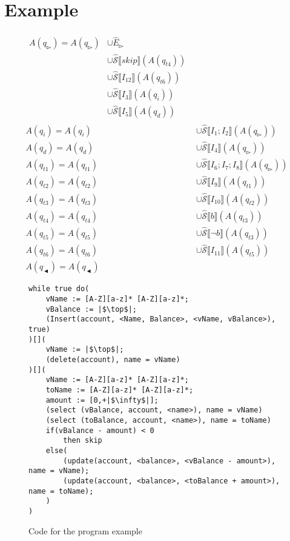 \section{Example}\label{sec:example}

\begin{align}\label{eq:exaple equation}
    \begin{split}
    A(q_\whitepointerright)=A(q_\whitepointerright) &\cup \hat E_\whitepointerright \\&\cup \mathcal{\hat S} \lBrack skip \rBrack(A(q_{t4}))\\&\cup \mathcal{\hat S} \lBrack I_{12} \rBrack (A(q_{t6})) \\&\cup \mathcal{\hat S} \lBrack I_3 \rBrack (A(q_i)) \\&\cup \mathcal{\hat S} \lBrack I_5 \rBrack (A(q_d))
    \end{split}\\
    A(q_i)=A(q_i)&\cup \mathcal{\hat S} \lBrack I_1;I_2 \rBrack (A(q_\whitepointerright ))\\
    A(q_d)=A(q_d)&\cup \mathcal{\hat S} \lBrack I_4 \rBrack (A(q_\whitepointerright ))\\
    A(q_{t1})=A(q_{t1})&\cup \mathcal{\hat S} \lBrack I_6;I_7;I_8 \rBrack (A(q_\whitepointerright))\\
    A(q_{t2})=A(q_{t2})&\cup \mathcal{\hat S} \lBrack I_9 \rBrack (A(q_{t1}))\\
    A(q_{t3})=A(q_{t3})&\cup \mathcal{\hat S} \lBrack I_{10} \rBrack (A(q_{t2}))\\
    A(q_{t4})=A(q_{t4})&\cup \mathcal{\hat S} \lBrack b \rBrack (A(q_{t3}))\\
    A(q_{t5})=A(q_{t5})&\cup \mathcal{\hat S} \lBrack \neg b \rBrack (A(q_{t3}))\\
    A(q_{t6})=A(q_{t6})&\cup \mathcal{\hat S} \lBrack I_{11} \rBrack (A(q_{t5}))\\
    A(q_\blackpointerleft)=A(q_\blackpointerleft)
\end{align}

\begin{figure}
    \begin{verbatim}
while true do(
    vName := [A-Z][a-z]* [A-Z][a-z]*;
    vBalance := |$\top$|;
    (Insert(account, <Name, Balance>, <vName, vBalance>), true)
)[](
    vName := |$\top$|;
    (delete(account), name = vName)
)[](
    vName := [A-Z][a-z]* [A-Z][a-z]*;
    toName := [A-Z][a-z]* [A-Z][a-z]*;
    amount := [0,+|$\infty$|];
    (select (vBalance, account, <name>), name = vName)
    (select (toBalance, account, <name>), name = toName)
    if(vBalance - amount) < 0
        then skip
    else(
        (update(account, <balance>, <vBalance - amount>), name = vName);
        (update(account, <balance>, <toBalance + amount>), name = toName);
    )
)
    \end{verbatim}
    \caption{Code for the program example}
    \label{fig:program-code}
\end{figure}

